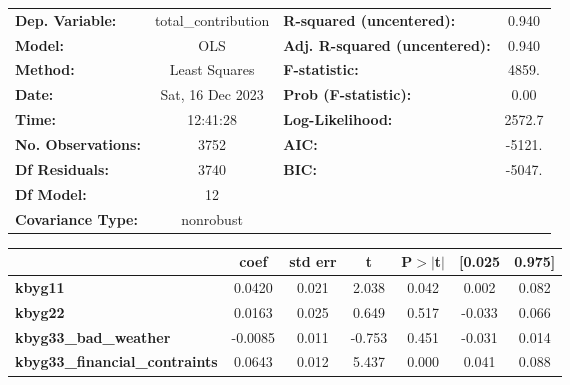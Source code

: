 \begin{center}
\begin{tabular}{lclc}
\toprule
\textbf{Dep. Variable:}                      & total\_contribution & \textbf{  R-squared (uncentered):}      &     0.940   \\
\textbf{Model:}                              &         OLS         & \textbf{  Adj. R-squared (uncentered):} &     0.940   \\
\textbf{Method:}                             &    Least Squares    & \textbf{  F-statistic:       }          &     4859.   \\
\textbf{Date:}                               &   Sat, 16 Dec 2023  & \textbf{  Prob (F-statistic):}          &     0.00    \\
\textbf{Time:}                               &       12:41:28      & \textbf{  Log-Likelihood:    }          &    2572.7   \\
\textbf{No. Observations:}                   &          3752       & \textbf{  AIC:               }          &    -5121.   \\
\textbf{Df Residuals:}                       &          3740       & \textbf{  BIC:               }          &    -5047.   \\
\textbf{Df Model:}                           &            12       & \textbf{                     }          &             \\
\textbf{Covariance Type:}                    &      nonrobust      & \textbf{                     }          &             \\
\bottomrule
\end{tabular}
\begin{tabular}{lcccccc}
                                             & \textbf{coef} & \textbf{std err} & \textbf{t} & \textbf{P$> |$t$|$} & \textbf{[0.025} & \textbf{0.975]}  \\
\midrule
\textbf{kbyg11}                              &       0.0420  &        0.021     &     2.038  &         0.042        &        0.002    &        0.082     \\
\textbf{kbyg22}                              &       0.0163  &        0.025     &     0.649  &         0.517        &       -0.033    &        0.066     \\
\textbf{kbyg33\_bad\_weather}                &      -0.0085  &        0.011     &    -0.753  &         0.451        &       -0.031    &        0.014     \\
\textbf{kbyg33\_financial\_contraints}       &       0.0643  &        0.012     &     5.437  &         0.000        &        0.041    &        0.088     \\

\end{tabular}
\end{center}
